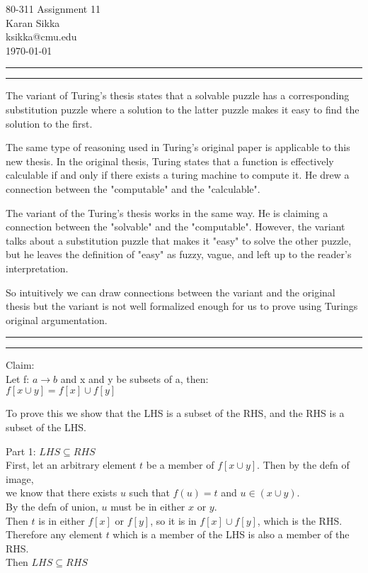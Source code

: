 \documentclass[11pt,letterpaper]{article}
\makeatletter
\newcommand{\question}[1] {\vspace{.25in} \hrule\vspace{0.5em}
\noindent{\bf #1} \vspace{0.5em}
\hrule \vspace{.10in}}
\newcommand{\myname}{Karan Sikka}
\newcommand{\myandrew}{ksikka@cmu.edu}
\newcommand{\myhwnum}{11}
\makeatother
\begin{document}
\medskip

\thispagestyle{plain}
\begin{center}                  %
{\Large 80-311 Assignment \myhwnum} \\
\myname \\
\myandrew \\
\today
\end{center}

\question{1}
The variant of Turing's thesis states that a solvable puzzle
has a corresponding substitution puzzle where a solution to the latter puzzle
makes it easy to find the solution to the first.

The same type of reasoning used in Turing's original paper is applicable to this new thesis.
In the original thesis, Turing states that a function is effectively calculable if and only if there
exists a turing machine to compute it. He drew a connection between the "computable" and the "calculable".

The variant of the Turing's thesis works in the same way. He is claiming a connection between the "solvable"
and the "computable". However, the variant talks about a substitution puzzle that makes it "easy" to solve the other puzzle,
but he leaves the definition of "easy" as fuzzy, vague, and left up to the reader's interpretation.

So intuitively we can draw connections between the variant and the original thesis but the variant is not well formalized enough for us
to prove using Turings original argumentation.

\question{2.i}
Claim:\\
Let f: $a \rightarrow b$ and x and y be subsets of a, then:\\
$f[x \cup y] = f[x] \cup f[y]$

To prove this we show that the LHS is a subset of the RHS, and the RHS is a subset of the LHS.

Part 1: $LHS \subseteq RHS$\\
First, let an arbitrary element $t$ be a member of $f[x \cup y]$. Then by the defn of image,\\
we know that there exists $u$ such that $f(u) = t$ and $u \in (x \cup y)$.\\
By the defn of union, $u$ must be in either $x$ or $y$.\\
Then $t$ is in either $f[x]$ or $f[y]$, so it is in $f[x] \cup f[y]$, which is the RHS.\\
Therefore any element $t$ which is a member of the LHS is also a member of the RHS.\\
Then $LHS \subseteq RHS$
\end{document}
